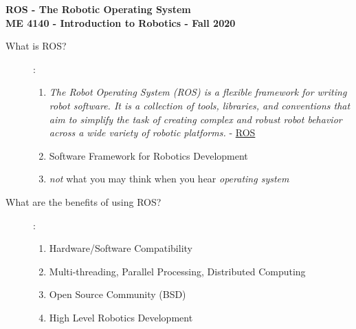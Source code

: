 \documentclass[12pt]{article}
\begin{document}
\thispagestyle{plain}

\begin{center}
    {\bf \Large ROS - The Robotic Operating System} \vspace{3mm} \\
   {\bf \large ME 4140 - Introduction to Robotics - Fall 2020} \\
\end{center}

\Large
\begin{description}

    	\item[What is ROS?]: 
            \begin{enumerate}
		\item {\it The Robot Operating System (ROS) is a flexible framework for writing robot software. It is a collection of tools, libraries, and conventions that aim to simplify the task of creating complex and robust robot behavior across a wide variety of robotic platforms.} - \href{http://www.ros.org/about-ros/}{ROS}       
                 \item Software Framework for Robotics Development
                \item {\it not} what you may think when you hear {\it operating system}                    
            \end{enumerate}
      
        \item[What are the benefits of using ROS?]: 
            \begin{enumerate}
                \item Hardware/Software Compatibility   
                \item Multi-threading, Parallel Processing, Distributed Computing  
                \item Open Source Community (BSD)    
                \item High Level Robotics Development                   
            \end{enumerate}    
            


\end{description}
\end{document}

